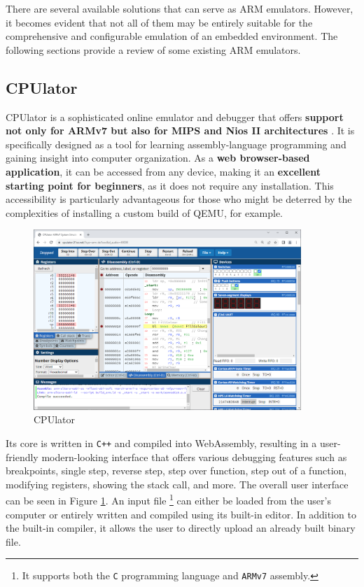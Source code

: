 \documentclass[english, ing, kiv, he, iso690numb, pdf]{fasthesis}
\begin{document}
	There are several available solutions that can serve as ARM emulators. However, it becomes evident that not all of them may be entirely suitable for the comprehensive and configurable emulation of an embedded environment. The following sections provide a review of some existing ARM emulators.
	
	\subsection{CPUlator}
	
	CPUlator is a sophisticated online emulator and debugger that offers \textbf{support not only for ARMv7 but also for MIPS and Nios II architectures} \cite{CPUlator}. It is specifically designed as a tool for learning assembly-language programming and gaining insight into computer organization. As a \textbf{web browser-based application}, it can be accessed from any device, making it an \textbf{excellent starting point for beginners}, as it does not require any installation. This accessibility is particularly advantageous for those who might be deterred by the complexities of installing a custom build of QEMU, for example.
	
	\begin{figure}[ht]
		\centering
		\includegraphics[width=0.9\textwidth]{img/diagrams/cpulator.png}
		\caption{CPUlator}
		\label{CPUlator}
	\end{figure}
	
	\newpage
	
	Its core is written in \texttt{C++} and compiled into WebAssembly, resulting in a user-friendly modern-looking interface that offers various debugging features such as breakpoints, single step, reverse step, step over function, step out of a function, modifying registers, showing the stack call, and more. The overall user interface can be seen in Figure \ref{CPUlator}. An input file \footnote{It supports both the \texttt{C} programming language and \texttt{ARMv7} assembly.} can either be loaded from the user's computer or entirely written and compiled using its built-in editor. In addition to the built-in compiler, it allows the user to directly upload an already built binary file. 
	
\end{document}
